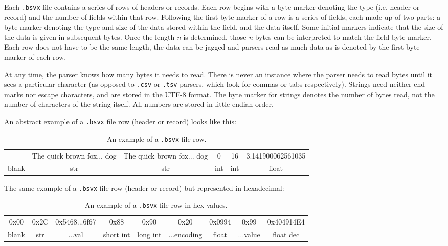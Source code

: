 \documentclass[10pt]{article}
\begin{document}
Each \texttt{.bsvx} file contains a series of rows of headers or records.
Each row begins with a byte marker denoting the type (i.e. header or record) and the number of fields within that row.
Following the first byte marker of a row is a series of fields, each made up of two parts: a byte marker denoting the type and size of the data stored within the field, and the data itself.
Some initial markers indicate that the size of the data is given in subsequent bytes.
Once the length \textit{n} is determined, those \textit{n} bytes can be interpreted to match the field byte marker.
Each row does not have to be the same length, the data can be jagged and parsers read as much data as is denoted by the first byte marker of each row. 

\indent{}
At any time, the parser knows how many bytes it needs to read.
There is never an instance where the parser needs to read bytes until it sees a particular character (as opposed to \texttt{.csv} or \texttt{.tsv} parsers, which look for commas or tabs respectively).
Strings need neither end marks nor escape characters, and are stored in the UTF-8 format.
The byte marker for strings denotes the number of bytes read, not the number of characters of the string itself.
All numbers are stored in little endian order.

\indent{}
An abstract example of a \texttt{.bsvx} file row (header or record) looks like this:

\begin{table}[H]
\centering
\begin{tabular}{|c|c|c|c|c|c|}
\hline
& The quick brown fox... dog & The quick brown fox... dog & 0 & 16 & 3.141900062561035 \\
blank & str & str & int & int & float \\ \hline
\end{tabular}
\caption{An example of a \texttt{.bsvx} file row.}
\label{tab:bsvxApproach_example}
\end{table}

\indent{}
The same example of a \texttt{.bsvx} file row (header or record) but represented in hexadecimal:

\begin{table}[H]
\centering
\begin{tabular}{|c|c|c|c|c|c|c|c|c|}
\hline
0x00 & 0x2C & 0x5468...6f67 & 0x88 & 0x90 & 0x20 & 0x0994 & 0x99 & 0x404914E4 \\
blank & str & ...val & short int & long int & ...encoding & float & ...value & float dec \\ \hline
\end{tabular}
\caption{An example of a \texttt{.bsvx} file row in hex values.}
\label{tab:bsvxApproach_example in hexadecimal}
\end{table}
\end{document}
